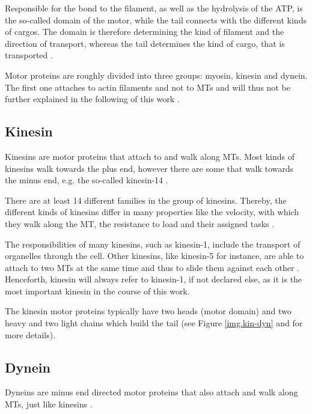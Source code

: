 Responsible for the bond to the filament, as well as the hydrolysis of the ATP, is the so-called domain of the motor, while the tail connects with the different kinds of cargos. The domain is
therefore determining the kind of filament and the direction of transport, whereas the tail determines the kind of cargo, that is transported \cite{alberts}.

Motor proteins are roughly divided into three groups: myosin, kinesin and dynein. The first one attaches to actin filaments and not to MTs and will thus not be further explained in the following of
this work \cite{alberts}.

\subsection{Kinesin}\label{ss.kinesin}
Kinesins are motor proteins that attach to and walk along MTs. Most kinds of kinesins walk towards the plus end, however there are some that walk towards the minus end, e.g. the so-called
kinesin-14 \cite{alberts}.

There are at least 14 different families in the group of kinesins. Thereby, the different kinds of kinesins differ in many properties like the velocity, with which they walk along the MT, the 
resistance to load and their assigned tasks \cite{alberts}.

The responsibilities of many kinesins, such as kinesin-1, include the transport of organelles through the cell. Other kinesins, like kinesin-5 for instance, are able to attach to two MTs at the
same time and thus to slide them against each other \cite{alberts}. Henceforth, kinesin will always refer to kinesin-1, if not declared else, as it is the most important kinesin in the course of
this work.


The kinesin motor proteins typically have two heads (motor domain) and two heavy and two light chains which build the tail (see Figure \ref{img.kin-dyn} and \cite{alberts} for more details).

\subsection{Dynein}\label{ss.dynein}
Dyneins are minus end directed motor proteins that also attach and walk along MTs, just like kinesins \cite{alberts}.

